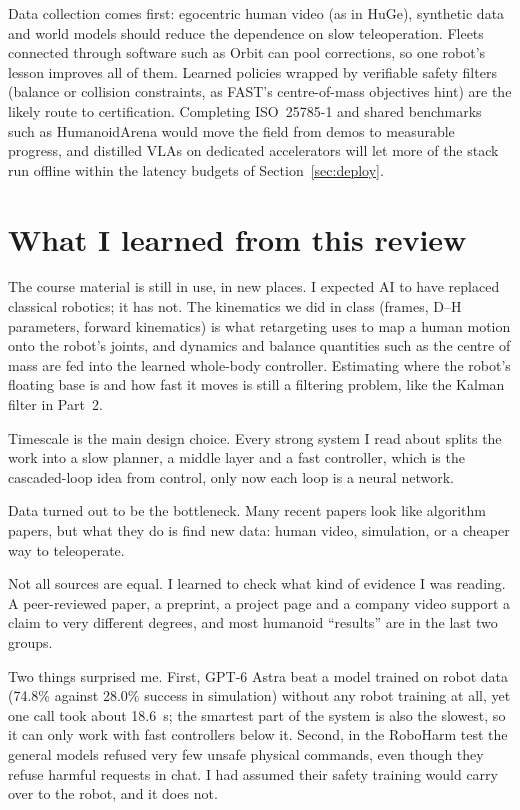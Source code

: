 \documentclass[11pt,a4paper]{article}
\begin{document}
Data collection comes first: egocentric human video (as in HuGe), synthetic
data and world models should reduce the dependence on slow teleoperation.
Fleets connected through software such as Orbit can pool corrections, so one
robot's lesson improves all of them.  Learned policies wrapped by verifiable
safety filters (balance or collision constraints, as FAST's centre-of-mass
objectives hint) are the likely route to certification.  Completing
ISO~25785-1 and shared benchmarks such as HumanoidArena would move the field
from demos to measurable progress, and distilled VLAs on dedicated
accelerators will let more of the stack run offline within the latency budgets
of Section~\ref{sec:deploy}.

\section{What I learned from this review}

The course material is still in use, in new places.  I expected AI to have
replaced classical robotics; it has not.  The kinematics we did in class
(frames, D--H parameters, forward kinematics) is what retargeting uses to map a
human motion onto the robot's joints, and dynamics and balance quantities such
as the centre of mass are fed into the learned whole-body controller.
Estimating where the robot's floating base is and how fast it moves is still a
filtering problem, like the Kalman filter in Part~2.

Timescale is the main design choice.  Every strong system I read about splits
the work into a slow planner, a middle layer and a fast controller, which is
the cascaded-loop idea from control, only now each loop is a neural network.

Data turned out to be the bottleneck.  Many recent papers look like algorithm
papers, but what they do is find new data: human video, simulation, or a
cheaper way to teleoperate.

Not all sources are equal.  I learned to check what kind of evidence I was
reading.  A peer-reviewed paper, a preprint, a project page and a company video
support a claim to very different degrees, and most humanoid ``results'' are in
the last two groups.

Two things surprised me.  First, GPT-6 Astra beat a model trained on robot data
(74.8\% against 28.0\% success in simulation) without any robot training at
all, yet one call took about 18.6~s; the smartest part of the system is also
the slowest, so it can only work with fast controllers below it.  Second, in
the RoboHarm test the general models refused very few unsafe physical commands,
even though they refuse harmful requests in chat.  I had assumed their safety
training would carry over to the robot, and it does not.
\end{document}
